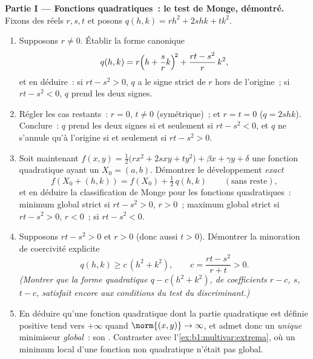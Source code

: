 \begin{problem}
\medskip
\noindent\textbf{Partie I --- Fonctions quadratiques~: le test de
Monge, démontré.} Fixons des réels $r, s, t$ et posons $q(h, k) = r h^2 + 2s hk +
t k^2$.
\begin{enumerate}
  \item Supposons $r \neq 0$. Établir la forme canonique
        \[
        q(h, k) = r\Bigl(h + \frac{s}{r}k\Bigr)^{\!2}
        + \frac{rt - s^2}{r}\,k^2 ,
        \]
        et en déduire~: si $rt - s^2 > 0$, $q$ a le signe strict
        de $r$ hors de l'origine~; si $rt - s^2 < 0$, $q$ prend
        les deux signes.
  \item Régler les cas restants~: $r = 0$, $t \neq 0$
        (symétrique)~; et $r = t = 0$ ($q = 2shk$). Conclure~:
        $q$ prend les deux signes si et seulement si $rt - s^2 <
        0$, et $q$ ne s'annule qu'à l'origine si et seulement si
        $rt - s^2 > 0$.
  \item Soit maintenant $f(x, y) = \frac12\bigl(r x^2 + 2s xy + t
        y^2\bigr) + \beta x + \gamma y + \delta$ une fonction
        quadratique ayant un  $X_0 = (a, b)$.
        Démontrer le développement \emph{exact}
        \[
        f(X_0 + (h,k)) = f(X_0) + \tfrac12\,q(h, k)
        \qquad (\text{sans reste}),
        \]
        et en déduire la classification de Monge pour les
        fonctions quadratiques~: minimum global strict si $rt -
        s^2 > 0$, $r > 0$~; maximum global strict si $rt - s^2 >
        0$, $r < 0$~;  si $rt - s^2 < 0$.
  \item Supposons $rt - s^2 > 0$ et $r > 0$ (donc aussi $t > 0$).
        Démontrer la minoration de coercivité explicite
        \[
        q(h, k) \geq c\,(h^2 + k^2),
        \qquad
        c = \frac{rt - s^2}{r + t} > 0 .
        \]
        \emph{(Montrer que la forme quadratique $q - c(h^2 + k^2)$,
        de coefficients $r - c$, $s$, $t - c$, satisfait encore
        aux conditions du test du discriminant.)}
  \item En déduire qu'une fonction quadratique dont la partie
        quadratique est définie positive tend vers $+\infty$
        quand $\norm{(x,y)} \to \infty$, et admet donc un
        \emph{unique} minimiseur \emph{global}~: son . Contraster avec
        l'\cref{ex:b1:multivar:extrema}, où un minimum local d'une
        fonction non quadratique n'était pas global.
\end{enumerate}


\end{problem}

